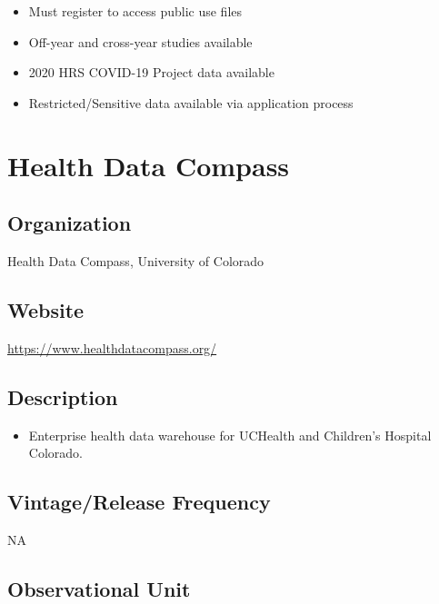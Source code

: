\documentclass[
]{book}
\providecommand{\tightlist}{%
  \setlength{\itemsep}{0pt}\setlength{\parskip}{0pt}}
\begin{document}
\begin{itemize}
\tightlist
\item
  Must register to access public use files
\item
  Off-year and cross-year studies available
\item
  2020 HRS COVID-19 Project data available
\item
  Restricted/Sensitive data available via application process
\end{itemize}

\mainmatter

\hypertarget{health-data-compass}{%
\chapter{Health Data Compass}\label{health-data-compass}}

\hypertarget{organization-31}{%
\section{Organization}\label{organization-31}}

Health Data Compass, University of Colorado

\hypertarget{website-31}{%
\section{Website}\label{website-31}}

\url{https://www.healthdatacompass.org/}

\hypertarget{description-31}{%
\section{Description}\label{description-31}}

\begin{itemize}
\tightlist
\item
  Enterprise health data warehouse for UCHealth and Children's Hospital Colorado.
\end{itemize}

\hypertarget{vintagerelease-frequency-31}{%
\section{Vintage/Release Frequency}\label{vintagerelease-frequency-31}}

NA

\hypertarget{observational-unit-31}{%
\section{Observational Unit}\label{observational-unit-31}}
\end{document}
